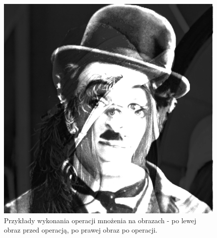 \documentclass{article}
\begin{document}
\begin{figure}[!htb]
\includegraphics[scale=0.2]{img/_Mnozenie_Obrazka__lena_8bit_gray.png} 
\caption{Przykłady wykonania operacji mnożenia na obrazach - po lewej obraz przed operacją, po prawej obraz po operacji. }
\end{figure}
\end{document}
